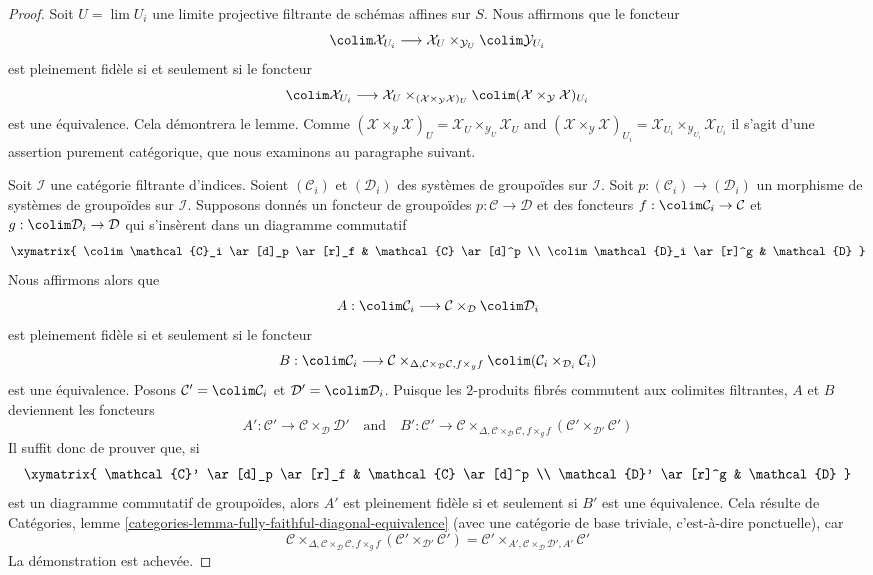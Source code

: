 \begin{proof}
Soit $U = \lim U_i$ une limite projective filtrante de schémas affines sur
$S$. Nous affirmons que le foncteur
$$
\colim \mathcal{X}_{U_i} \longrightarrow
\mathcal{X}_U \times_{\mathcal{Y}_U} \colim \mathcal{Y}_{U_i}
$$
est pleinement fidèle si et seulement si le foncteur
$$
\colim \mathcal{X}_{U_i} \longrightarrow
\mathcal{X}_U \times_{(\mathcal{X} \times_\mathcal{Y} \mathcal{X})_U}
\colim (\mathcal{X} \times_\mathcal{Y} \mathcal{X})_{U_i}
$$
est une équivalence. Cela démontrera le lemme. Comme
$(\mathcal{X} \times_\mathcal{Y} \mathcal{X})_U =
\mathcal{X}_U \times_{\mathcal{Y}_U} \mathcal{X}_U$
and
$(\mathcal{X} \times_\mathcal{Y} \mathcal{X})_{U_i} =
\mathcal{X}_{U_i} \times_{\mathcal{Y}_{U_i}} \mathcal{X}_{U_i}$
il s'agit d'une assertion purement catégorique, que nous examinons au
paragraphe suivant.

\medskip\noindent
Soit $\mathcal{I}$ une catégorie filtrante d'indices. Soient
$(\mathcal{C}_i)$ et $(\mathcal{D}_i)$ des systèmes de groupoïdes sur
$\mathcal{I}$. Soit
$p : (\mathcal{C}_i) \to (\mathcal{D}_i)$ un morphisme de systèmes de
groupoïdes sur $\mathcal{I}$. Supposons donnés un foncteur de groupoïdes
$p : \mathcal{C} \to \mathcal{D}$ et des foncteurs
$f : \colim \mathcal{C}_i \to \mathcal{C}$ et
$g : \colim \mathcal{D}_i \to \mathcal{D}$
qui s'insèrent dans un diagramme commutatif
$$
\xymatrix{
\colim \mathcal{C}_i \ar[d]_p \ar[r]_f & \mathcal{C} \ar[d]^p \\
\colim \mathcal{D}_i \ar[r]^g & \mathcal{D}
}
$$
Nous affirmons alors que
$$
A : \colim \mathcal{C}_i \longrightarrow
\mathcal{C} \times_\mathcal{D} \colim \mathcal{D}_i
$$
est pleinement fidèle si et seulement si le foncteur
$$
B : \colim \mathcal{C}_i \longrightarrow
\mathcal{C}
\times_{\Delta, \mathcal{C} \times_\mathcal{D} \mathcal{C}, f \times_g f}
\colim (\mathcal{C}_i \times_{\mathcal{D}_i} \mathcal{C}_i)
$$
est une équivalence. Posons $\mathcal{C}' = \colim \mathcal{C}_i$ et
$\mathcal{D}' = \colim \mathcal{D}_i$. Puisque les $2$-produits fibrés
commutent aux colimites filtrantes, $A$ et $B$ deviennent les foncteurs
$$
A' : \mathcal{C}' \to \mathcal{C} \times_\mathcal{D} \mathcal{D}'
\quad\text{and}\quad
B' : \mathcal{C}' \longrightarrow
\mathcal{C}
\times_{\Delta, \mathcal{C} \times_\mathcal{D} \mathcal{C}, f \times_g f}
(\mathcal{C}' \times_{\mathcal{D}'} \mathcal{C}')
$$
Il suffit donc de prouver que, si
$$
\xymatrix{
\mathcal{C}' \ar[d]_p \ar[r]_f & \mathcal{C} \ar[d]^p \\
\mathcal{D}' \ar[r]^g & \mathcal{D}
}
$$
est un diagramme commutatif de groupoïdes, alors $A'$ est pleinement fidèle
si et seulement si $B'$ est une équivalence. Cela résulte de Catégories,
lemme \ref{categories-lemma-fully-faithful-diagonal-equivalence} (avec une
catégorie de base triviale, c'est-à-dire ponctuelle), car
$$
\mathcal{C}
\times_{\Delta, \mathcal{C} \times_\mathcal{D} \mathcal{C}, f \times_g f}
(\mathcal{C}' \times_{\mathcal{D}'} \mathcal{C}') =
\mathcal{C}'
\times_{A', \mathcal{C} \times_\mathcal{D} \mathcal{D}', A'}
\mathcal{C}'
$$
La démonstration est achevée.
\end{proof}

